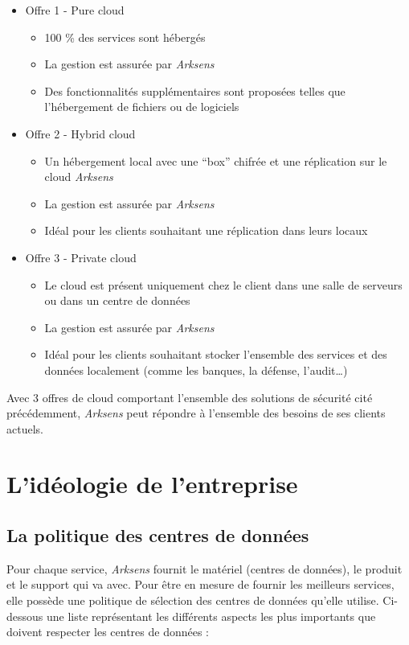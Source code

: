 \documentclass[a4paper,10pt, twoside]{report}
\begin{document}
\begin{spacing}{1.2}
\begin{itemize}
  \item Offre 1 - Pure cloud
  \noindent
  \begin{itemize}
    \item 100 \% des services sont h\'eberg\'es
    \item La gestion est assur\'ee par \textit{Arksens}
    \item Des fonctionnalit\'es suppl\'ementaires sont propos\'ees telles que
    l'h\'ebergement de fichiers ou de logiciels
  \end{itemize}
  \item Offre 2 - Hybrid cloud
  \noindent
  \begin{itemize}
    \item Un h\'ebergement local avec une ``box'' chifr\'ee et une
    r\'eplication sur le cloud \textit{Arksens}
    \item La gestion est assur\'ee par \textit{Arksens}
    \item Id\'eal pour les clients souhaitant une r\'eplication dans leurs
    locaux
  \end{itemize}
  \item Offre 3 - Private cloud
  \noindent
  \begin{itemize}
    \item Le cloud est pr\'esent uniquement chez le client dans une salle de
    serveurs ou dans un centre de donn\'ees
    \item La gestion est assur\'ee par \textit{Arksens}
    \item Id\'eal pour les clients souhaitant stocker l'ensemble des services
    et des donn\'ees localement (comme les banques, la d\'efense,
    l'audit\ldots{})
  \end{itemize}
\end{itemize}

Avec 3 offres de cloud comportant l'ensemble des solutions de s\'ecurit\'e
cité pr\'ec\'edemment, \textit{Arksens} peut répondre à l'ensemble des besoins
de ses clients actuels.

\section{L'id\'eologie de l'entreprise}
\subsection{La politique des centres de données}

Pour chaque service, \textit{Arksens} fournit le mat\'eriel (centres de
donn\'ees), le produit et le support qui va avec. Pour \^etre en mesure de
fournir les meilleurs services, elle poss\`ede une politique de s\'election des
centres de donn\'ees qu'elle utilise. Ci-dessous une liste repr\'esentant les
diff\'erents aspects les plus importants que doivent respecter les centres de
donn\'ees :


\end{spacing}
\end{document}
